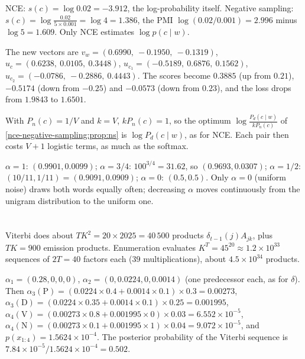 NCE: $s(c) = \log0.02 = -3.912$, the log-probability itself. Negative sampling: $s(c) = \log\frac{0.02}{5\times0.001} = \log4 = 1.386$, the PMI
$\log(0.02/0.001) = 2.996$ minus $\log5 = 1.609$. Only NCE estimates $\log p(c\mid w)$.

The new vectors are $v_w = (0.6990,\ -0.1950,\ -0.1319)$, $u_c = (0.6238,\ 0.0105,\ 0.3448)$, $u_{c_1} = (-0.5189,\ 0.6876,\ 0.1562)$,
$u_{c_2} = (-0.0786,\ -0.2886,\ 0.4443)$. The scores become $0.3885$ (up from $0.21$), $-0.5174$ (down from $-0.25$) and $-0.0573$
(down from $0.23$), and the loss drops from $1.9843$ to $1.6501$.

With $P_n(c) = 1/V$ and $k = V$, $kP_n(c) = 1$, so the optimum $\log\frac{P_d(c\mid w)}{kP_n(c)}$ of \cref{nce-negative-sampling:prop:ns} is $\log P_d(c\mid w)$, as for NCE.
Each pair then costs $V + 1$ logistic terms, as much as the softmax.

$\alpha = 1$: $(0.9901, 0.0099)$; $\alpha = 3/4$: $100^{3/4} = 31.62$, so $(0.9693, 0.0307)$; $\alpha = 1/2$: $(10/11, 1/11) = (0.9091, 0.0909)$; $\alpha = 0$: $(0.5, 0.5)$. Only
$\alpha = 0$ (uniform noise) draws both words equally often; decreasing $\alpha$ moves continuously from the
unigram distribution to the uniform one.

\section{}

Viterbi does about $TK^2 = 20\times2025 = 40\,500$ products $\delta_{t-1}(j)A_{jk}$, plus $TK = 900$ emission products. Enumeration
evaluates $K^T = 45^{20}\approx1.2\times10^{33}$ sequences of $2T = 40$ factors each ($39$ multiplications), about $4.5\times10^{34}$ products.

$\alpha_1 = (0.28, 0, 0, 0)$, $\alpha_2 = (0, 0.0224, 0, 0.0014)$ (one predecessor each, as for $\delta$). Then
$\alpha_3(\mathrm P) = (0.0224\times0.4 + 0.0014\times0.1)\times0.3 = 0.00273$, $\alpha_3(\mathrm D) = (0.0224\times0.35 + 0.0014\times0.1)\times0.25 = 0.001995$,
$\alpha_4(\mathrm V) = (0.00273\times0.8 + 0.001995\times0)\times0.03 = 6.552\times10^{-5}$, $\alpha_4(\mathrm N) = (0.00273\times0.1 + 0.001995\times1)\times0.04 = 9.072\times10^{-5}$, and
$p(x_{1:4}) = 1.5624\times10^{-4}$. The posterior probability of the Viterbi sequence is $7.84\times10^{-5}/1.5624\times10^{-4} = 0.502$.

